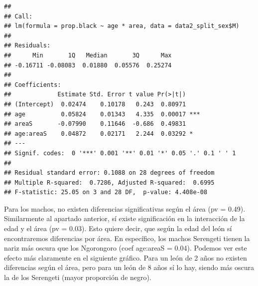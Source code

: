 \documentclass[
]{article}
\newenvironment{Shaded}{\begin{snugshade}}{\end{snugshade}}
\newcommand{\AttributeTok}[1]{\textcolor[rgb]{0.77,0.63,0.00}{#1}}
\newcommand{\FunctionTok}[1]{\textcolor[rgb]{0.00,0.00,0.00}{#1}}
\newcommand{\NormalTok}[1]{#1}
\newcommand{\OtherTok}[1]{\textcolor[rgb]{0.56,0.35,0.01}{#1}}
\newcommand{\SpecialCharTok}[1]{\textcolor[rgb]{0.00,0.00,0.00}{#1}}
\begin{document}
\begin{Shaded}
\end{Shaded}

\begin{verbatim}
## 
## Call:
## lm(formula = prop.black ~ age * area, data = data2_split_sex$M)
## 
## Residuals:
##      Min       1Q   Median       3Q      Max 
## -0.16711 -0.08083  0.01880  0.05576  0.25274 
## 
## Coefficients:
##             Estimate Std. Error t value Pr(>|t|)    
## (Intercept)  0.02474    0.10178   0.243  0.80971    
## age          0.05824    0.01343   4.335  0.00017 ***
## areaS       -0.07990    0.11646  -0.686  0.49831    
## age:areaS    0.04872    0.02171   2.244  0.03292 *  
## ---
## Signif. codes:  0 '***' 0.001 '**' 0.01 '*' 0.05 '.' 0.1 ' ' 1
## 
## Residual standard error: 0.1088 on 28 degrees of freedom
## Multiple R-squared:  0.7286, Adjusted R-squared:  0.6995 
## F-statistic: 25.05 on 3 and 28 DF,  p-value: 4.408e-08
\end{verbatim}

Para los machos, no existen diferencias significativas según el área (pv
= 0.49). Similarmente al apartado anterior, sí existe significación en
la interacción de la edad y el área (pv = 0.03). Esto quiere decir, que
según la edad del león sí encontraremos diferencias por área. En
específico, los machos Serengeti tienen la nariz más oscura que los
Ngorongoro (coef age:areaS = 0.04). Podemos ver este efecto más
claramente en el siguiente gráfico. Para un león de 2 años no existen
diferencias según el área, pero para un león de 8 años sí lo hay, siendo
más oscura la de los Serengeti (mayor proporción de negro).
\end{document}
